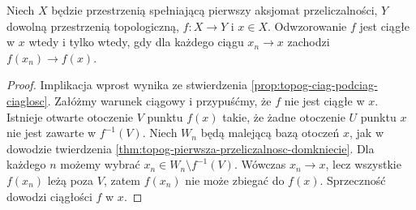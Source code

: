 \begin{twierdzenie}
\label{thm:topog-ciagowe-kryterium-ciaglosci}
Niech $X$ będzie przestrzenią spełniającą
pierwszy aksjomat przeliczalności,
$Y$ dowolną przestrzenią topologiczną, $f\colon X\to Y$
i $x\in X$. Odwzorowanie $f$ jest ciągłe w $x$
wtedy i tylko wtedy, gdy dla każdego ciągu $x_n\to x$
zachodzi $f(x_n)\to f(x)$.
\end{twierdzenie}
\begin{proof}
Implikacja wprost wynika ze stwierdzenia
\ref{prop:topog-ciag-podciag-ciaglosc}.
Załóżmy warunek ciągowy i przypuśćmy, że $f$
nie jest ciągłe w $x$. Istnieje otwarte otoczenie
$V$ punktu $f(x)$ takie, że żadne otoczenie $U$
punktu $x$ nie jest zawarte w $f^{-1}(V)$.
Niech $W_n$ będą malejącą bazą otoczeń $x$,
jak w dowodzie twierdzenia
\ref{thm:topog-pierwsza-przeliczalnosc-domkniecie}.
Dla każdego $n$ możemy wybrać
$x_n\in W_n\setminus f^{-1}(V)$.
Wówczas $x_n\to x$, lecz wszystkie $f(x_n)$ leżą poza
$V$, zatem $f(x_n)$ nie może zbiegać do $f(x)$.
Sprzeczność dowodzi ciągłości $f$ w $x$.
\end{proof}

